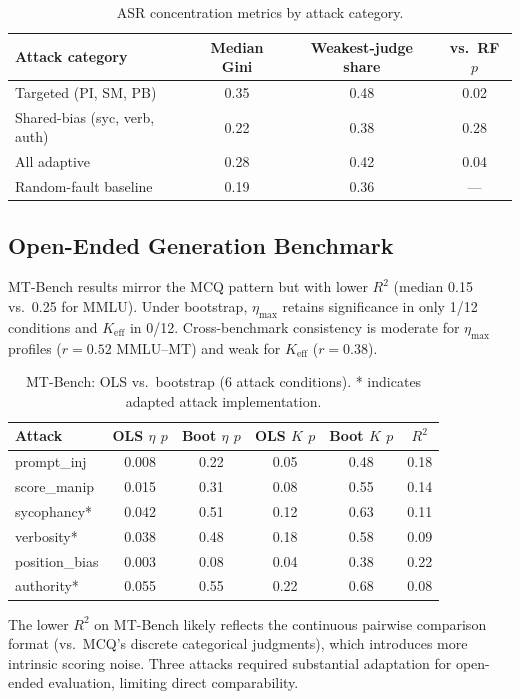 \documentclass[11pt]{article}
\begin{document}
\begin{table}[h]
\centering
\caption{ASR concentration metrics by attack category.}
\label{tab:concentration}
\small
\begin{tabular}{lccc}
\toprule
Attack category & Median Gini & Weakest-judge share & vs.\ RF $p$ \\
\midrule
Targeted (PI, SM, PB) & 0.35 & 0.48 & 0.02 \\
Shared-bias (syc, verb, auth) & 0.22 & 0.38 & 0.28 \\
All adaptive & 0.28 & 0.42 & 0.04 \\
Random-fault baseline & 0.19 & 0.36 & --- \\
\bottomrule
\end{tabular}
\end{table}

\subsection{Open-Ended Generation Benchmark}
\label{sec:mtbench}

MT-Bench results mirror the MCQ pattern but with lower $R^2$ (median 0.15 vs.\ 0.25 for MMLU). Under bootstrap, $\eta_{\max}$ retains significance in only 1/12 conditions and $K_{\text{eff}}$ in 0/12. Cross-benchmark consistency is moderate for $\eta_{\max}$ profiles ($r = 0.52$ MMLU--MT) and weak for $K_{\text{eff}}$ ($r = 0.38$).

\begin{table}[h]
\centering
\caption{MT-Bench: OLS vs.\ bootstrap (6 attack conditions). * indicates adapted attack implementation.}
\label{tab:mtbench}
\small
\begin{tabular}{lccccc}
\toprule
Attack & OLS $\eta$ $p$ & Boot $\eta$ $p$ & OLS $K$ $p$ & Boot $K$ $p$ & $R^2$ \\
\midrule
prompt\_inj & 0.008 & 0.22 & 0.05 & 0.48 & 0.18 \\
score\_manip & 0.015 & 0.31 & 0.08 & 0.55 & 0.14 \\
sycophancy* & 0.042 & 0.51 & 0.12 & 0.63 & 0.11 \\
verbosity* & 0.038 & 0.48 & 0.18 & 0.58 & 0.09 \\
position\_bias & 0.003 & 0.08 & 0.04 & 0.38 & 0.22 \\
authority* & 0.055 & 0.55 & 0.22 & 0.68 & 0.08 \\
\bottomrule
\end{tabular}
\end{table}

The lower $R^2$ on MT-Bench likely reflects the continuous pairwise comparison format (vs.\ MCQ's discrete categorical judgments), which introduces more intrinsic scoring noise. Three attacks required substantial adaptation for open-ended evaluation, limiting direct comparability.
\end{document}
